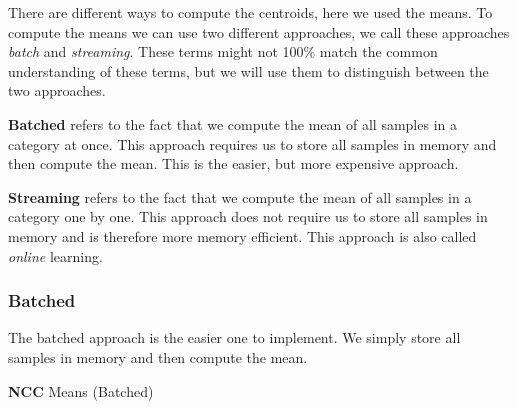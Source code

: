 \documentclass[a4paper]{article}
\begin{document}
There are different ways to compute the centroids, here we used the means.
To compute the means we can use two different approaches, we call these approaches \textit{batch} and \textit{streaming}.
These terms might not 100\% match the common understanding of these terms, but we will use them to distinguish between the two approaches.

\textbf{Batched} refers to the fact that we compute the mean of all samples in a category at once. This approach requires
us to store all samples in memory and then compute the mean. This is the easier, but more expensive approach.

\textbf{Streaming} refers to the fact that we compute the mean of all samples in a category one by one. This approach does not require
us to store all samples in memory and is therefore more memory efficient. This approach is also called \textit{online} learning.

\subsubsection{Batched}
The batched approach is the easier one to implement. We simply store all samples in memory and then compute the mean.
\begin{algorithm}
\LinesNumbered
\caption{\textbf{NCC} Means (Batched)}\label{alg:ncc_batched}
\\
\\
\end{algorithm}
\end{document}

